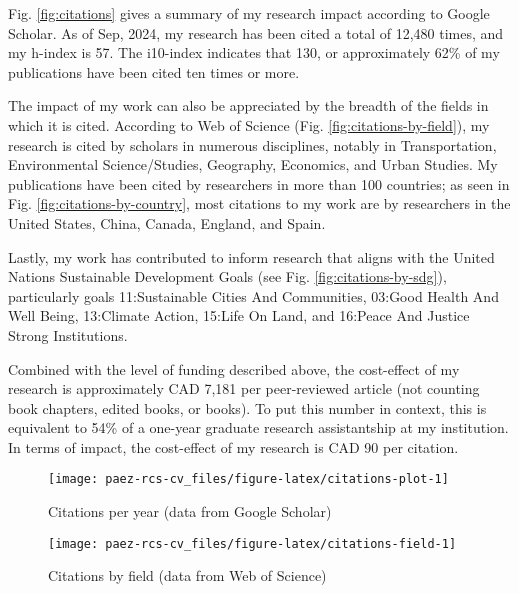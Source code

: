 \documentclass[11pt,a4paper,]{awesome-cv}
\begin{document}
Fig. \ref{fig:citations} gives a summary of my research impact according
to Google Scholar. As of Sep, 2024, my research has been cited a total
of 12,480 times, and my h-index is 57. The i10-index indicates that 130,
or approximately 62\% of my publications have been cited ten times or
more.

The impact of my work can also be appreciated by the breadth of the
fields in which it is cited. According to Web of Science (Fig.
\ref{fig:citations-by-field}), my research is cited by scholars in
numerous disciplines, notably in Transportation, Environmental
Science/Studies, Geography, Economics, and Urban Studies. My
publications have been cited by researchers in more than 100 countries;
as seen in Fig. \ref{fig:citations-by-country}, most citations to my
work are by researchers in the United States, China, Canada, England,
and Spain.

Lastly, my work has contributed to inform research that aligns with the
United Nations Sustainable Development Goals (see Fig.
\ref{fig:citations-by-sdg}), particularly goals 11:Sustainable Cities
And Communities, 03:Good Health And Well Being, 13:Climate Action,
15:Life On Land, and 16:Peace And Justice Strong Institutions.

Combined with the level of funding described above, the cost-effect of
my research is approximately CAD 7,181 per peer-reviewed article (not
counting book chapters, edited books, or books). To put this number in
context, this is equivalent to 54\% of a one-year graduate research
assistantship at my institution. In terms of impact, the cost-effect of
my research is CAD 90 per citation.

\begin{figure}

{\centering \texttt{[image: paez-rcs-cv\_files/figure-latex/citations-plot-1]} 

}

\caption{\label{fig:citations}Citations per year (data from Google Scholar)}\label{fig:citations-plot}
\end{figure}

\begin{figure}

{\centering \texttt{[image: paez-rcs-cv\_files/figure-latex/citations-field-1]} 

}

\caption{\label{fig:citations-by-field}Citations by field (data from Web of Science)}\label{fig:citations-field}
\end{figure}
\end{document}
